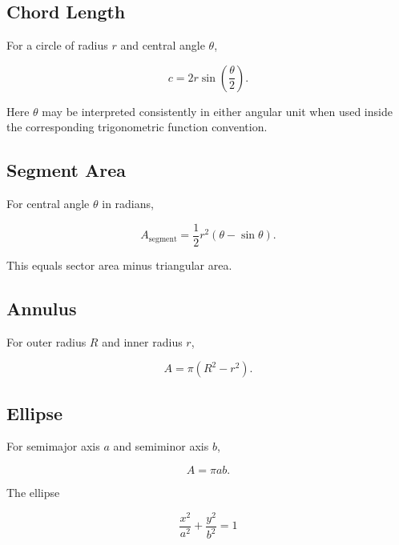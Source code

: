\subsection{Chord Length}
\label{subsec:chord-length-reference}

For a circle of radius \(r\) and central angle \(\theta\),

\[
\boxed{
c
=
2r
\sin
\left(
\frac{\theta}{2}
\right).
}
\]

Here \(\theta\) may be interpreted consistently in either angular unit when
used inside the corresponding trigonometric function convention.

\subsection{Segment Area}
\label{subsec:circular-segment-area}

For central angle \(\theta\) in radians,

\[
\boxed{
A_{\mathrm{segment}}
=
\frac12r^2
(\theta-\sin\theta).
}
\]

This equals sector area minus triangular area.

\subsection{Annulus}
\label{subsec:annulus-formula}

For outer radius \(R\) and inner radius \(r\),

\[
\boxed{
A
=
\pi
(R^2-r^2).
}
\]

\subsection{Ellipse}
\label{subsec:ellipse-area-reference}

For semimajor axis \(a\) and semiminor axis \(b\),

\[
\boxed{
A
=
\pi ab.
}
\]

The ellipse

\[
\boxed{
\frac{x^2}{a^2}
+
\frac{y^2}{b^2}
=
1
}
\]

